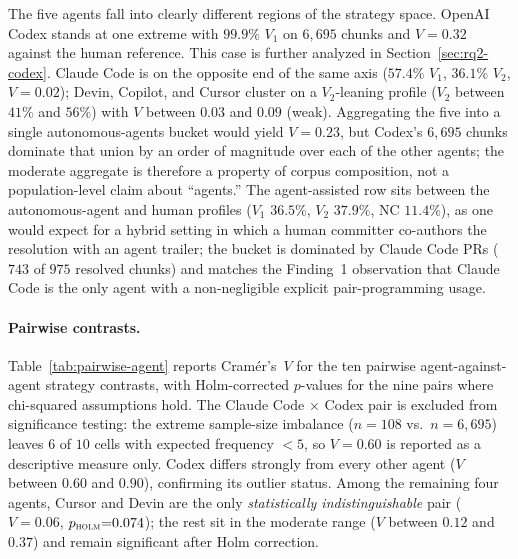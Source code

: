\documentclass[sigconf,anonymous]{acmart}
\begin{document}
The five agents fall into clearly different regions of the strategy space. OpenAI Codex stands at one extreme with $99.9\%$ $V_1$ on $6{,}695$ chunks and $V{=}0.32$ against the human reference. This case is further analyzed in Section~\ref{sec:rq2-codex}. Claude Code is on the opposite end of the same axis ($57.4\%$ $V_1$, $36.1\%$ $V_2$, $V{=}0.02$); Devin, Copilot, and Cursor cluster on a $V_2$-leaning profile ($V_2$ between $41\%$ and $56\%$) with $V$ between $0.03$ and $0.09$ (weak). Aggregating the five into a single autonomous-agents bucket would yield $V{=}0.23$, but Codex's $6{,}695$ chunks dominate that union by an order of magnitude over each of the other agents; the moderate aggregate is therefore a property of corpus composition, not a population-level claim about ``agents.'' The agent-assisted row sits between the autonomous-agent and human profiles ($V_1$ $36.5\%$, $V_2$ $37.9\%$, NC $11.4\%$), as one would expect for a hybrid setting in which a human committer co-authors the resolution with an agent trailer; the bucket is dominated by Claude Code PRs ($743$ of $975$ resolved chunks) and matches the Finding~1 observation that Claude Code is the only agent with a non-negligible explicit pair-programming usage.

\paragraph{Pairwise contrasts.} Table~\ref{tab:pairwise-agent} reports Cram\'{e}r's~$V$ for the ten pairwise agent-against-agent strategy contrasts, with Holm-corrected $p$-values for the nine pairs where chi-squared assumptions hold. The Claude Code $\times$ Codex pair is excluded from significance testing: the extreme sample-size imbalance ($n{=}108$ vs.\ $n{=}6{,}695$) leaves $6$ of $10$ cells with expected frequency ${<}5$, so $V{=}0.60$ is reported as a descriptive measure only. Codex differs strongly from every other agent ($V$ between $0.60$ and $0.90$), confirming its outlier status. Among the remaining four agents, Cursor and Devin are the only \emph{statistically indistinguishable} pair ($V{=}0.06$, $p_{\textsc{holm}}{=}0.074$); the rest sit in the moderate range ($V$ between $0.12$ and $0.37$) and remain significant after Holm correction.
\end{document}
